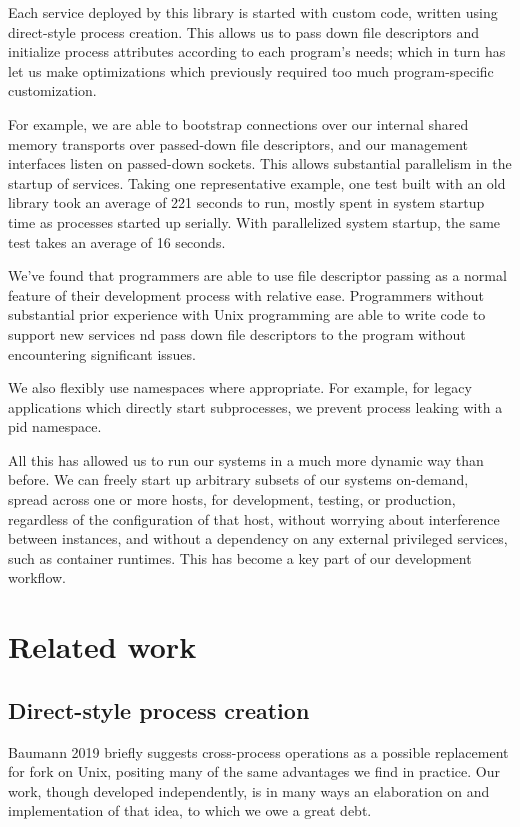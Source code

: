 \documentclass[letterpaper,twocolumn,10pt]{article}
\begin{document}
Each service deployed by this library is started with custom code,
written using direct-style process creation.
This allows us to pass down file descriptors and initialize process attributes
according to each program's needs;
which in turn has let us make optimizations which previously required too much program-specific customization.

For example,
we are able to bootstrap connections over our internal shared memory transports over passed-down file descriptors,
and our management interfaces listen on passed-down sockets.
This allows substantial parallelism in the startup of services.\cite{socketactivation}
Taking one representative example,
one test built with an old library took an average of 221 seconds to run,
mostly spent in system startup time as processes started up serially.
With parallelized system startup, the same test takes an average of 16 seconds.

We've found that programmers
are able to use file descriptor passing as a normal feature of their development process with relative ease.
Programmers without substantial prior experience with Unix programming
are able to write code to support new services
nd pass down file descriptors to the program without encountering significant issues.

We also flexibly use namespaces where appropriate.
For example, for legacy applications which directly start subprocesses,
we prevent process leaking with a pid namespace.

All this has allowed us to run our systems in a much more dynamic way than before.
We can freely start up arbitrary subsets of our systems on-demand,
spread across one or more hosts,
for development, testing, or production,
regardless of the configuration of that host,
without worrying about interference between instances,
and without a dependency on any external privileged services,
such as container runtimes.
This has become a key part of our development workflow.
\section{Related work}\label{related_work}
\subsection{Direct-style process creation}
Baumann 2019\cite{forkroad} briefly suggests cross-process operations as a possible replacement for fork on Unix,
positing many of the same advantages we find in practice.
Our work, though developed independently,
is in many ways an elaboration on and implementation of that idea,
to which we owe a great debt.
\end{document}

